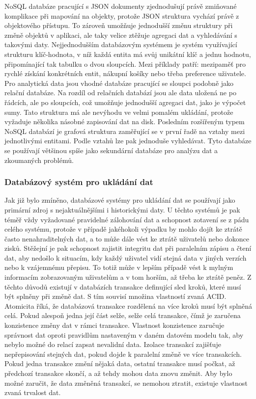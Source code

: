 	\Ac{NoSQL} databáze pracující s \Ac{JSON} dokumenty zjednodušují právě zmiňované komplikace při mapování
	na objekty, protože \Ac{JSON} struktura vychází právě z objektového přístupu.
	To zároveň umožňuje jednodušší změnu struktury při změně objektů v aplikaci, ale taky velice ztěžuje agregaci dat
	a vyhledávání s takovými daty.
	Nejjednodušším databázovým systémem je systém využívající strukturu klíč-hodnota, v níž každá entita má svůj unikátní klíč
	a jednu hodnotu, připomínající tak tabulku o dvou sloupcích.
	Mezi příklady patří: mezipaměť pro rychlé získání konkrétních entit, nákupní košíky nebo třeba preference uživatele.
	Pro analytická data jsou vhodné databáze pracující se sloupci podobně jako relační databáze.
	Na rozdíl od relačních databází jsou ale data uložená ne po řádcích, ale po sloupcích, což umožňuje jednodušší agregaci
	dat, jako je výpočet sumy.
	Tato struktura má ale nevýhodu ve velmi pomalém ukládání, protože vyžaduje několika násobné zapisování dat na disk.
	Posledním rozšířeným typem \Ac{NoSQL} databází je grafová struktura zaměřující se v první řadě na vztahy mezi
	jednotlivými entitami.
	Podle vztahů lze pak jednoduše vyhledávat.
	Tyto databáze se používají většinou spíše jako sekundární databáze pro analýzu dat a zkoumaných problémů.
	\cite{types-of-nosql-databases}

		\subsubsection{Databázový systém pro ukládání dat}

		Jak již bylo zmíněno, databázové systémy pro ukládání dat se používají jako primární zdroj s nejaktuálnějšími i
		historickými daty.
		U těchto systémů je pak téměř vždy vyžadované pravidelné zálohování dat a schopnost zotavení se z pádu celého
		systému, protože v případě jakéhokoli výpadku by mohlo dojít ke ztrátě často nenahraditelných dat, a to může
		dále vést ke ztrátě uživatelů nebo dokonce zisků.
		Stěžejní je pak schopnost zajistit integritu dat při paralelním zápisu a čtení dat, aby nedošlo k situacím,
		kdy každý uživatel vidí stejná data v jiných verzích nebo k vzájemnému přepisu.
		To totiž může v lepším případě vést k mylným informacím zobrazovaným uživatelům a v tom horším, až třeba ke ztrátě
		peněz.
		Z těchto důvodů existují v databázích transakce definující sled kroků, které musí být splněny při změně dat.
		S tím souvisí množina vlastností zvaná \Ac{ACID}.
		Atomicita říká, že databázová transakce rozdělená na více kroků musí být splněná celá.
		Pokud alespoň jedna její část selže, selže celá transakce, čímž je zaručena konzistence změny dat v rámci transakce.
		Vlastnost konzistence zaručuje správnost dat oproti pravidlům nastaveným v daném datovém modelu tak, aby nebylo možné
		do relací zapsat nevalidní data.
		Izolace transakcí zajišťuje nepřepisování stejných dat, pokud dojde k paralelní změně ve více
		transakcích.
		Pokud jedna transakce změní nějaká data, ostatní transakce musí počkat, až předchozí transakce skončí, a až tehdy
		mohou data znovu změnit.
		Aby bylo možné zaručit, že data změněná transakcí, se nemohou ztratit, existuje vlastnost
		zvaná trvalost dat. \cite{acid-compliance}

